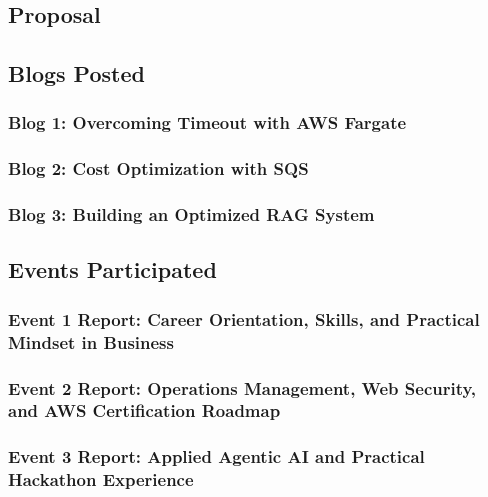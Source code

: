 \newpage

\subsection{Proposal}



\newpage

\subsection{Blogs Posted}

\subsubsection{Blog 1: Overcoming Timeout with AWS Fargate}


\subsubsection{Blog 2: Cost Optimization with SQS}


\subsubsection{Blog 3: Building an Optimized RAG System}


\newpage

\subsection{Events Participated}

\subsubsection{Event 1 Report: Career Orientation, Skills, and Practical Mindset in Business}


\subsubsection{Event 2 Report: Operations Management, Web Security, and AWS Certification Roadmap}


\subsubsection{Event 3 Report: Applied Agentic AI and Practical Hackathon Experience}


